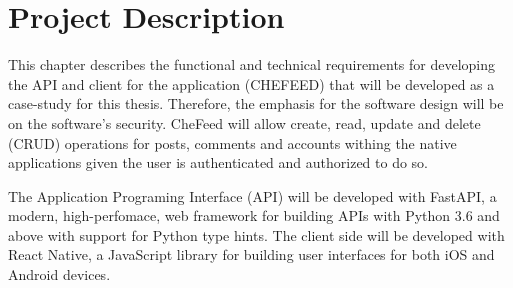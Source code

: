 \section{Project Description}
This chapter describes the functional and technical requirements for developing the API and client for the application (CHEFEED) that will be developed as a case-study for this thesis. Therefore, the emphasis for the software design will be on the software's security.
CheFeed will allow create, read, update and delete (CRUD) operations for posts, comments and accounts withing the native applications given the user is authenticated and authorized to do so.

The Application Programing Interface (API) will be developed with FastAPI, a modern, high-perfomace, web framework for building APIs with Python 3.6 and above with support for Python type hints. The client side will be developed with React Native, a JavaScript library for building user interfaces for both iOS and Android devices.


